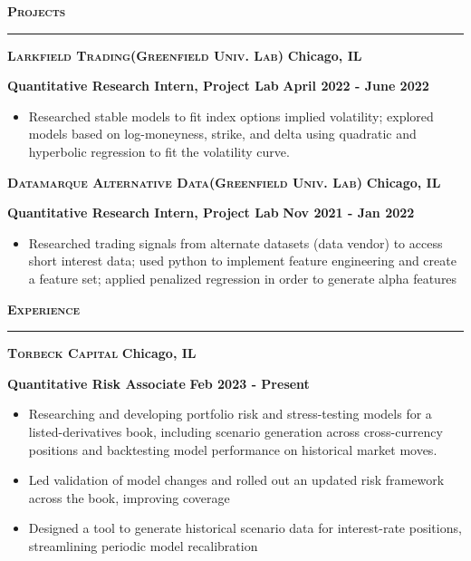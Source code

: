 \documentclass{article}
\newcommand{\vs}{\vspace{0.3cm}}
\begin{document}
\noindent \textbf{\textsc{\large Projects}}

\noindent \rule[3pt]{\textwidth}{1pt}

\noindent \textbf{\textsc{Larkfield Trading(Greenfield Univ. Lab)}} \hfill \textbf{Chicago, IL}

\noindent \textbf{Quantitative Research Intern, Project Lab} \hfill \textbf{April 2022 - June 2022}
\begin{itemize}
	\item Researched stable models to fit index options implied volatility; explored models based on log-moneyness, strike, and delta using quadratic and hyperbolic regression to fit the volatility curve. 
\end{itemize}

\noindent \textbf{\textsc{Datamarque Alternative Data(Greenfield Univ. Lab)}} \hfill \textbf{Chicago, IL}

\noindent \textbf{Quantitative Research Intern, Project Lab} \hfill \textbf{Nov 2021 - Jan 2022}
\begin{itemize}
	\item Researched trading signals from alternate datasets (data vendor) to access short interest data; used python to implement feature engineering and create a feature set; applied penalized regression in order to generate alpha features

\end{itemize}
\vs

\noindent \textbf{\textsc{\large Experience}}

\noindent \rule[3pt]{\textwidth}{1pt}

\noindent \textbf{\textsc{Torbeck Capital}} \hfill \textbf{Chicago, IL}

\noindent \textbf{Quantitative Risk Associate} \hfill \textbf{Feb 2023 - Present}
\begin{itemize}
	\item Researching and developing portfolio risk and stress-testing models for a listed-derivatives book, including scenario generation across cross-currency positions and backtesting model performance on historical market moves. 
	\item Led validation of model changes and rolled out an updated risk framework across the book, improving coverage
	\item Designed a tool to generate historical scenario data for interest-rate positions, streamlining periodic model recalibration
\end{itemize}
\end{document}
